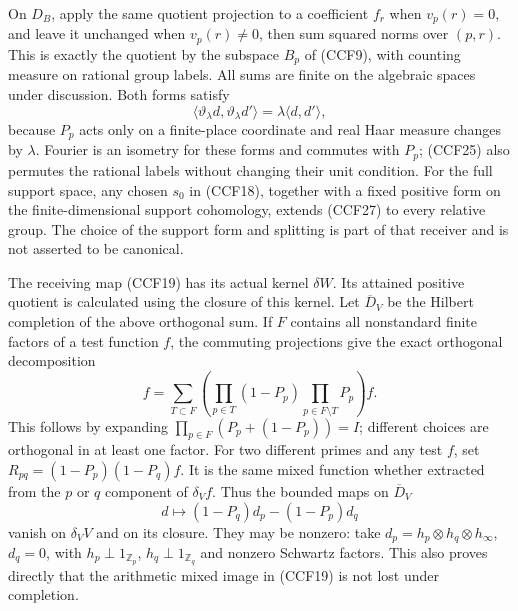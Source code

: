 \documentclass[11pt,a4paper]{article}
\theoremstyle{definition}\newtheorem{definition}[theorem]{Definition}
\begin{document}
On $D_B$, apply the same quotient projection to a coefficient
$f_r$ when $v_p(r)=0$, and leave it unchanged when
$v_p(r)\ne0$, then sum squared norms over $(p,r)$.
This is exactly the quotient by the subspace $B_p$ of (CCF9),
with counting measure on rational group labels. All sums are
finite on the algebraic spaces under discussion. Both forms
satisfy
\[
 \langle\vartheta_\lambda d,\vartheta_\lambda d'\rangle
       =\lambda\langle d,d'\rangle,
 \tag{CCF27}
\]
because $P_p$ acts only on a finite-place coordinate and real
Haar measure changes by $\lambda$. Fourier is an isometry
for these forms and commutes with $P_p$; (CCF25) also permutes
the rational labels without changing their unit condition.
For the full support space, any chosen $s_0$ in (CCF18),
together with a fixed positive form on the finite-dimensional
support cohomology, extends (CCF27) to every relative group.
The choice of the support form and splitting is part of that
receiver and is not asserted to be canonical.

The receiving map (CCF19) has its actual kernel $\delta W$.
Its attained positive quotient is calculated using the closure
of this kernel. Let $\overline D_V$ be the Hilbert completion
of the above orthogonal sum. If $F$ contains all nonstandard
finite factors of a test function $f$, the commuting projections
give the exact orthogonal decomposition
\[
 f=\sum_{T\subset F}
       \left(\prod_{p\in T}(1-P_p)\prod_{p\in F\setminus T}P_p\right)f.
 \tag{CCF28}
\]
This follows by expanding $\prod_{p\in F}(P_p+(1-P_p))=I$;
different choices are orthogonal in at least one factor.
For two different primes and any test $f$, set
$R_{pq}=(1-P_p)(1-P_q)f$. It is the same mixed function
whether extracted from the $p$ or $q$ component of $\delta_Vf$.
Thus the bounded maps on $\overline D_V$
\[
 d\longmapsto(1-P_q)d_p-(1-P_p)d_q
 \tag{CCF29}
\]
vanish on $\delta_VV$ and on its closure. They may be nonzero:
take $d_p=h_p\otimes h_q\otimes h_\infty$, $d_q=0$, with
$h_p\perp1_{\mathbb Z_p}$, $h_q\perp1_{\mathbb Z_q}$ and
nonzero Schwartz factors. This also proves directly that the
arithmetic mixed image in (CCF19) is not lost under completion.
\end{document}
